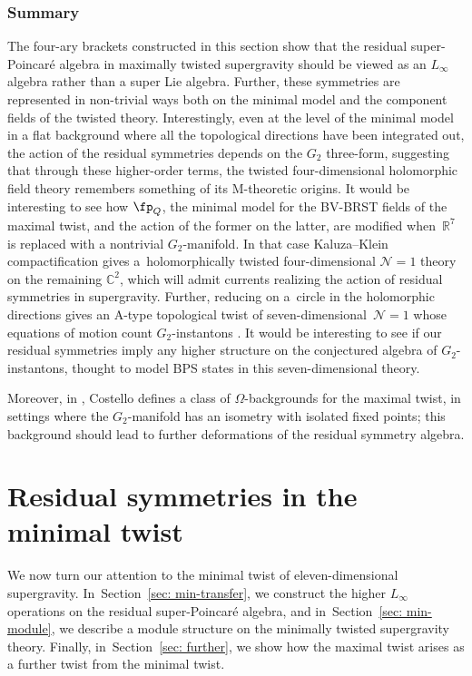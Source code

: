 \documentclass[pdftex]{sigma}
\numberwithin{equation}{section}
\theoremstyle{definition}
\def\R{\mathbb{R}}
\def\C{\mathbb{C}}
\begin{document}
\subsubsection{Summary}
The four-ary brackets constructed in this section show that the residual super-Poincar\'e algebra in maximally twisted supergravity should be viewed as an $L_\infty$ algebra rather than a super Lie algebra. Further, these symmetries are represented in non-trivial ways both on the minimal model and the component fields of the twisted theory. Interestingly, even at the level of the minimal model in a flat background where all the topological directions have been integrated out, the action of the residual symmetries depends on the $G_2$ three-form, suggesting that through these higher-order terms, the twisted four-dimensional holomorphic field theory remembers something of its M-theoretic origins. It would be interesting to see how $\fp_Q$, the minimal model for the BV-BRST fields of the maximal twist, and the action of the former on the latter, are modified when~$\R^7$ is replaced with a nontrivial $G_2$-manifold. In that case Kaluza--Klein compactification gives a~holomorphically twisted four-dimensional $\mathcal{N}=1$ theory on the remaining $\C^2$, which will admit currents realizing the action of residual symmetries in supergravity. Further, reducing on a~circle in the holomorphic directions gives an A-type topological twist of seven-dimensional~${\mathcal{N}=1}$ whose equations of motion count $G_2$-instantons \cite{EvidenceG2}. It would be interesting to see if our residual symmetries imply any higher structure on the conjectured algebra of $G_2$-instantons, thought to model BPS states in this seven-dimensional theory.

Moreover, in \cite{CostelloMtheory2}, Costello defines a class of $\Omega$-backgrounds for the maximal twist, in settings where the $G_2$-manifold has an isometry with isolated fixed points; this background should lead to further deformations of the residual symmetry algebra.

\section{Residual symmetries in the minimal twist} \label{sec: min}
We now turn our attention to the minimal twist of eleven-dimensional supergravity. In~Section~\ref{sec: min-transfer}, we construct the higher $L_\infty$ operations on the residual super-Poincar\'e algebra, and in~Section~\ref{sec: min-module}, we describe a module structure on the minimally twisted supergravity theory. Finally, in~Section~\ref{sec: further}, we show how the maximal twist arises as a further twist from the minimal twist.
\end{document}
